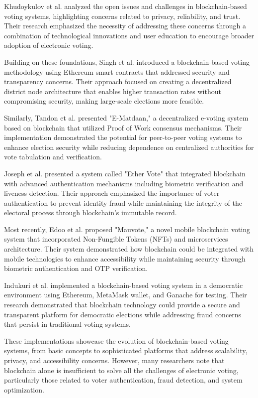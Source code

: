 \documentclass[conference]{IEEEtran}
\begin{document}
Khudoykulov et al. \cite{b1} analyzed the open issues and challenges in blockchain-based voting systems, highlighting concerns related to privacy, reliability, and trust. Their research emphasized the necessity of addressing these concerns through a combination of technological innovations and user education to encourage broader adoption of electronic voting.

Building on these foundations, Singh et al. \cite{b5} introduced a blockchain-based voting methodology using Ethereum smart contracts that addressed security and transparency concerns. Their approach focused on creating a decentralized district node architecture that enables higher transaction rates without compromising security, making large-scale elections more feasible.

Similarly, Tandon et al. \cite{b3} presented "E-Matdaan," a decentralized e-voting system based on blockchain that utilized Proof of Work consensus mechanisms. Their implementation demonstrated the potential for peer-to-peer voting systems to enhance election security while reducing dependence on centralized authorities for vote tabulation and verification.

Joseph et al. \cite{b6} presented a system called "Ether Vote" that integrated blockchain with advanced authentication mechanisms including biometric verification and liveness detection. Their approach emphasized the importance of voter authentication to prevent identity fraud while maintaining the integrity of the electoral process through blockchain's immutable record.

Most recently, Edoo et al. \cite{b7} proposed "Mauvote," a novel mobile blockchain voting system that incorporated Non-Fungible Tokens (NFTs) and microservices architecture. Their system demonstrated how blockchain could be integrated with mobile technologies to enhance accessibility while maintaining security through biometric authentication and OTP verification.

Indukuri et al. \cite{b8} implemented a blockchain-based voting system in a democratic environment using Ethereum, MetaMask wallet, and Ganache for testing. Their research demonstrated that blockchain technology could provide a secure and transparent platform for democratic elections while addressing fraud concerns that persist in traditional voting systems.

These implementations showcase the evolution of blockchain-based voting systems, from basic concepts to sophisticated platforms that address scalability, privacy, and accessibility concerns. However, many researchers note that blockchain alone is insufficient to solve all the challenges of electronic voting, particularly those related to voter authentication, fraud detection, and system optimization.
\end{document}
